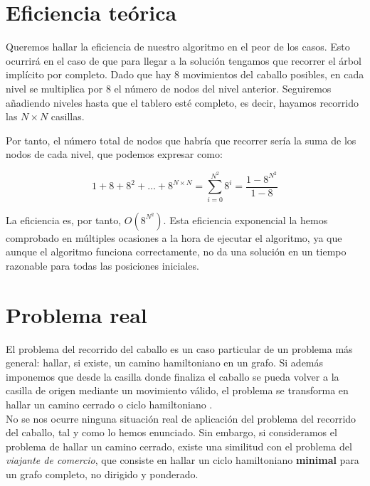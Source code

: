 \documentclass[11pt]{article}
\begin{document}

\section*{Eficiencia teórica}


Queremos hallar la eficiencia de nuestro algoritmo en el peor de los casos. Esto ocurrirá en el caso de que para llegar a la solución tengamos que recorrer el árbol implícito por completo. Dado que hay 8 movimientos del caballo posibles, en cada nivel se multiplica por 8 el número de nodos del nivel anterior. Seguiremos añadiendo niveles hasta que el tablero esté completo, es decir, hayamos recorrido las $N \times N$ casillas.

Por tanto, el número total de nodos que habría que recorrer sería la suma de los nodos de cada nivel, que podemos expresar como:

$$1 + 8 + 8^2 + \hdots + 8^{N\times N} = \sum_{i=0}^{N^2} 8^i = \frac{1 - 8^{N^2}}{1 - 8}$$

La eficiencia es, por tanto, $O\left( 8^{N^2} \right)$. Esta eficiencia exponencial la hemos comprobado en múltiples ocasiones a la hora de ejecutar el algoritmo, ya que aunque el algoritmo funciona correctamente, no da una solución en un tiempo razonable para todas las posiciones iniciales.


\section*{Problema real}

El problema del recorrido del caballo es un caso particular de un problema más general: hallar, si existe, un camino hamiltoniano \cite{wiki} en un grafo. Si además imponemos que desde la casilla donde finaliza el caballo se pueda volver a la casilla de origen mediante un movimiento válido, el problema se transforma en hallar un camino cerrado o ciclo hamiltoniano \cite{wiki}.\\

No se nos ocurre ninguna situación real de aplicación del problema del recorrido del caballo, tal y como lo hemos enunciado. Sin embargo, si consideramos el problema de hallar un camino cerrado, existe una similitud con el problema del \textit{viajante de comercio}, que consiste en hallar un ciclo hamiltoniano \textbf{minimal} para un grafo completo, no dirigido y ponderado.\\
\end{document}
